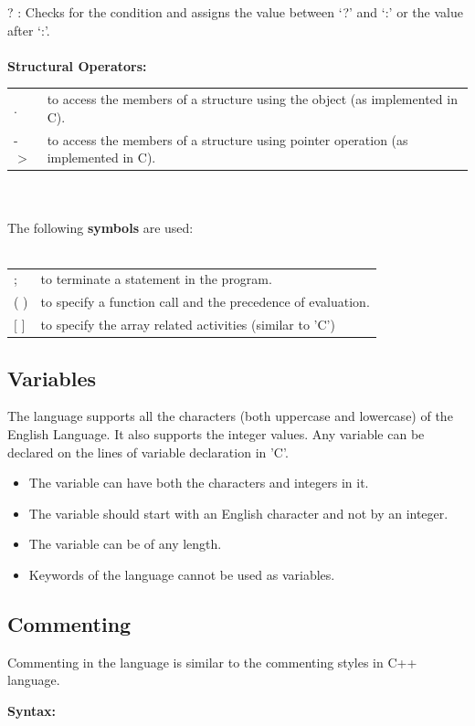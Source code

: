 \documentclass[12pt, oneside, a4paper]{article}
\begin{document}
? : Checks for the condition and assigns the value between `?' and `:' or the value after `:'.\\
\\\textbf{Structural Operators:}\\
\begin{tabular}{ll}
. & to access the members of a structure using the object (as implemented in C).\\
-$>$ & to access the members of a structure using pointer operation (as implemented in C).\\
\end{tabular}
\\\\The following \textbf{symbols} are used:\\\\
\begin{tabular}{ll}
; & to terminate a statement in the program.\\
( ) & to specify a function call and the precedence of evaluation.\\
$[$ $]$ & to specify the array related activities (similar to 'C')\\
\end{tabular}

\subsection{Variables}
The language supports all the characters (both uppercase and lowercase) of the English Language.  It also supports the integer values.  Any variable can be declared on the lines of variable declaration in 'C'.
\begin{itemize}
\item The variable can have both the characters and integers in it.
\item The variable should start with an English character and not by an integer.
\item The variable can be of any length.
\item Keywords of the language cannot be used as variables.
\end{itemize}

\subsection{Commenting}
Commenting in the language is similar to the commenting styles in C++ language.

\hspace{.5in} \textbf{Syntax:}
	
\end{document}
